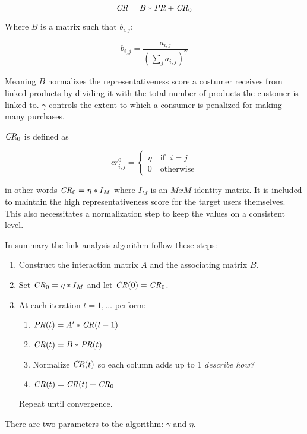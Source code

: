 \begin{equation}
    \mathit{CR} = B * \mathit{PR} + \mathit{CR}_0
\end{equation}

Where $B$ is a matrix such that $b_{i, j}$:

\begin{equation}
    b_{i, j} = \frac{ a_{i, j} }{ \left(\sum_{j} a_{i, j}\right)^\gamma }
\end{equation}

Meaning $B$ normalizes the representativeness score a costumer receives from linked products by dividing it with the total number of products the customer is linked to.  $\gamma$ controls the extent to which a consumer is penalized for making many purchases.

$\mathit{CR}_0$ is defined as

\begin{equation}
    cr_{i, j}^0 = \begin{cases}
        \eta \quad \text{if } \; i = j \\
        0    \quad \text{otherwise}
    \end{cases}
\end{equation}

in other words $\mathit{CR}_0 = \eta * I_M$ where $I_M$ is an $M x M$ identity matrix. It is included to maintain the high representativeness score for the target users themselves. This also necessitates a normalization step to keep the values on a consistent level.

In summary the link-analysis algorithm follow these steps:

\begin{enumerate}
    \item Construct the interaction matrix $A$ and the associating matrix $B$.

    \item Set $\mathit{CR}_0 = \eta * I_M$ and let $\mathit{CR}(0) = \mathit{CR}_0$.
    \item At each iteration $t = 1, \ldots$ perform:

        \begin{enumerate}
            \item $\mathit{PR}(t) = A' * \mathit{CR}(t - 1)$
            \item $\mathit{CR}(t) = B * \mathit{PR}(t)$
            \item Normalize $\mathit{CR}(t)$ so each column adds up to 1
                \textit{describe how?}
            \item $\mathit{CR}(t) = \mathit{CR}(t) + \mathit{CR}_0$
        \end{enumerate}

        Repeat until convergence.

\end{enumerate}

There are two parameters to the algorithm: $\gamma$ and $\eta$.

